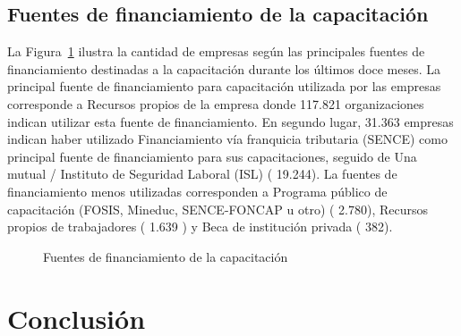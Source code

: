 \documentclass[
  11pt,
]{article}
\begin{document}
\subsection{Fuentes de financiamiento de la
capacitación}\label{fuentes-de-financiamiento-de-la-capacitaciuxf3n}

La Figura~\ref{fig-capacitacion_finan} ilustra la cantidad de empresas
según las principales fuentes de financiamiento destinadas a la
capacitación durante los últimos doce meses. La principal fuente de
financiamiento para capacitación utilizada por las empresas corresponde
a Recursos propios de la empresa donde 117.821 organizaciones indican
utilizar esta fuente de financiamiento. En segundo lugar, 31.363
empresas indican haber utilizado Financiamiento vía franquicia
tributaria (SENCE) como principal fuente de financiamiento para sus
capacitaciones, seguido de Una mutual / Instituto de Seguridad Laboral
(ISL) ( 19.244). La fuentes de financiamiento menos utilizadas
corresponden a Programa público de capacitación (FOSIS, Mineduc,
SENCE-FONCAP u otro) ( 2.780), Recursos propios de trabajadores ( 1.639
) y Beca de institución privada ( 382).

\begin{figure}[H]

\caption{\label{fig-capacitacion_finan}Fuentes de financiamiento de la
capacitación}


\end{figure}%

\newpage

\section{Conclusión}\label{conclusiuxf3n}
\end{document}
